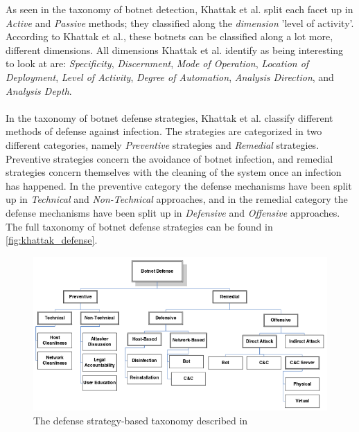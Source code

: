 \documentclass[a4paper,10pt]{article}
\begin{document}
\noindent As seen in the taxonomy of botnet detection, Khattak et al. split each facet up in \textit{Active} and \textit{Passive}
methods; they classified along the \textit{dimension} 'level of activity'. According to Khattak et al., these botnets can be
classified along a lot more, different dimensions. All dimensions Khattak et al. identify as being interesting to look at
are: \textit{Specificity}, \textit{Discernment}, \textit{Mode of Operation}, \textit{Location of Deployment}, \textit{Level of
Activity}, \textit{Degree of Automation}, \textit{Analysis Direction}, and \textit{Analysis Depth}.
\\\\
In the taxonomy of botnet defense strategies, Khattak et al. classify different methods of defense against infection.
The strategies are categorized in two different categories, namely \textit{Preventive} strategies and \textit{Remedial}
strategies. Preventive strategies concern the avoidance of botnet infection, and remedial strategies concern themselves
with the cleaning of the system once an infection has happened. In the preventive category the defense mechanisms have
been split up in \textit{Technical} and \textit{Non-Technical} approaches, and in the remedial category the defense mechanisms
have been split up in \textit{Defensive} and \textit{Offensive} approaches. The full taxonomy of botnet defense strategies can 
be found in \autoref{fig:khattak_defense}.
\\
\begin{figure}[hbtp]
 \centering
 \includegraphics[width=0.9\linewidth]{khattak-defense.png}
 \caption{The defense strategy-based taxonomy described in \cite{Khattak2014}}
 \label{fig:khattak_defense}
\end{figure}
\end{document}
